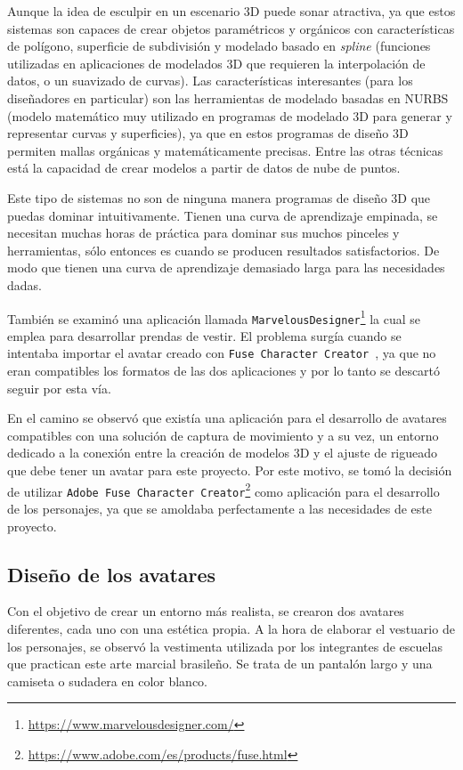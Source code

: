 Aunque la idea de esculpir en un escenario 3D puede sonar atractiva, ya que estos sistemas son capaces de crear objetos paramétricos y orgánicos con características de polígono, superficie de subdivisión y modelado basado en \textit{spline} (funciones utilizadas en aplicaciones de modelados 3D que requieren la interpolación de datos, o un suavizado de curvas). Las características interesantes (para los diseñadores en particular) son las herramientas de modelado basadas en NURBS (modelo matemático muy utilizado en programas de modelado 3D para generar y representar curvas y superficies), ya que en estos programas de diseño 3D permiten mallas orgánicas y matemáticamente precisas. Entre las otras técnicas está la capacidad de crear modelos a partir de datos de nube de puntos.

Este tipo de sistemas no son de ninguna manera programas de diseño 3D que puedas dominar intuitivamente. Tienen una curva de aprendizaje empinada, se necesitan muchas horas de práctica para dominar sus muchos pinceles y herramientas, sólo entonces es cuando se producen resultados satisfactorios. De modo que tienen una curva de aprendizaje demasiado larga para las necesidades dadas. 

También se examinó una aplicación llamada \texttt{MarvelousDesigner}\footnote{\url{https://www.marvelousdesigner.com/}} la cual se emplea para desarrollar prendas de vestir. El problema surgía cuando se intentaba importar el avatar creado con \texttt{Fuse Character Creator }, ya que no eran compatibles los formatos de las dos aplicaciones y por lo tanto se descartó seguir por esta vía. 

En el camino se observó que existía una aplicación para el desarrollo de avatares compatibles con una solución de captura de movimiento y a su vez, un entorno dedicado a la conexión entre la creación de modelos 3D y el ajuste de rigueado que debe tener un avatar para este proyecto. Por este motivo, se tomó la decisión de utilizar \texttt{Adobe Fuse Character Creator}\footnote{\url{https://www.adobe.com/es/products/fuse.html}} como aplicación para el desarrollo de los personajes, ya que se amoldaba perfectamente a las necesidades de este proyecto.

\subsection{Diseño de los avatares}

Con el objetivo de crear un entorno más realista, se crearon dos avatares diferentes, cada uno con una estética propia. A la hora de elaborar el vestuario de los personajes, se observó la vestimenta utilizada por los integrantes de escuelas que practican este arte marcial brasileño. Se trata de un pantalón largo y una camiseta o sudadera en color blanco. 

